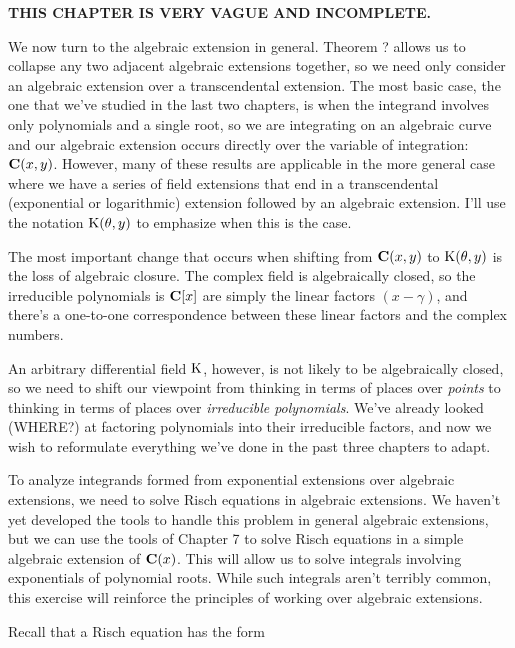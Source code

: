

{\bf THIS CHAPTER IS VERY VAGUE AND INCOMPLETE.}

We now turn to the algebraic extension in general.  Theorem ? allows
us to collapse any two adjacent algebraic extensions together, so we
need only consider an algebraic extension over a transcendental
extension.  The most basic case, the one that we've studied in the
last two chapters, is when the integrand involves only polynomials and
a single root, so we are integrating on an algebraic curve and our
algebraic extension occurs directly over the variable of integration:
${\bf C}(x,y)$.  However, many of these results are applicable in the
more general case where we have a series of field extensions that end
in a transcendental (exponential or logarithmic) extension followed by
an algebraic extension.  I'll use the notation ${\rm K}(\theta, y)$ to
emphasize when this is the case.

The most important change that occurs when shifting from $\mathbf{C}(x,y)$ to
${\rm K}(\theta,y)$ is the loss of algebraic closure.  The complex
field is algebraically closed, so the irreducible polynomials is
$\mathbf{C}[x]$ are simply the linear factors $(x-\gamma)$, and there's a
one-to-one correspondence between these linear factors and the complex
numbers.

An arbitrary differential field ${\rm K}$, however, is not likely to
be algebraically closed, so we need to shift our viewpoint from
thinking in terms of places over {\it points} to thinking in terms of
places over {\it irreducible polynomials}.  We've already looked
(WHERE?) at factoring polynomials into their irreducible factors, and
now we wish to reformulate everything we've done in the past three
chapters to adapt.


To analyze integrands formed from exponential extensions over algebraic
extensions, we need to solve Risch equations in algebraic extensions.
We haven't yet developed the
tools to handle this problem in general algebraic extensions, but we
can use the tools of Chapter 7 to solve Risch equations in a simple
algebraic extension of $\mathbf{C}(x)$.  This will allow us to solve integrals
involving exponentials of polynomial roots.  While such integrals
aren't terribly common, this exercise will reinforce the principles
of working over algebraic extensions.

Recall that a Risch equation has the form

